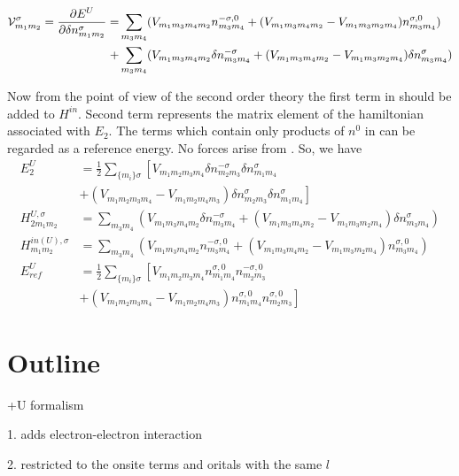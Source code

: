 \begin{equation}
\label{hamU}
\begin{split}
\mathcal{V}_{m_1m_2}^{\sigma}=\frac{\partial E^U}{\partial \delta n_{m_1m_2}^{\sigma}}=&\sum_{m_3m_4}(V_{m_1m_3m_4m_2}
n_{m_3m_4}^{-\sigma,0}+(V_{m_1m_3m_4m_2}-V_{m_1m_3m_2m_4})n_{m_3m_4}^{\sigma,0})\\
+&\sum_{m_3m_4}(V_{m_1m_3m_4m_2}
\delta n_{m_3m_4}^{-\sigma}+(V_{m_1m_3m_4m_2}-V_{m_1m_3m_2m_4})\delta n_{m_3m_4}^{\sigma})
\end{split}
\end{equation}
%
\par{Now from the point of view of the second order theory the first term in  should be added to $H^{in}$.
Second term represents the matrix element of the hamiltonian 
associated with $E_2$. The terms which contain only products of $n^0$ in  can be regarded as a reference energy. No forces arise from . So, we have}
%
\begin{equation}
\begin{split}
E_{2}^{U}&=\frac{1}{2}\sum_{\{m_i\}\sigma}\left [V_{m_1m_2m_3m_4}\delta n_{m_2m_3}^{-\sigma}\delta n_{m_1m_4}^{\sigma}\right. \\&\left.+
(V_{m_1m_2m_3m_4}-V_{m_1m_2m_4m_3})
\delta n_{m_2m_3}^{\sigma}\delta n_{m_1m_4}^{\sigma}\right]\\
H^{U,\sigma}_{2m_1m_2}&=\sum_{m_3m_4}(V_{m_1m_3m_4m_2}
\delta n_{m_3m_4}^{-\sigma}+(V_{m_1m_3m_4m_2}-V_{m_1m_3m_2m_4})\delta n_{m_3m_4}^{\sigma})\\
H^{in(U), \sigma}_{m_1m_2}&=\sum_{m_3m_4}(V_{m_1m_3m_4m_2}
n_{m_3m_4}^{-\sigma,0}+(V_{m_1m_3m_4m_2}-V_{m_1m_3m_2m_4})n_{m_3m_4}^{\sigma,0})\\
E^{U}_{ref}&=\frac{1}{2}\sum_{\{m_i\}\sigma}\left[V_{m_1m_2m_3m_4}n_{m_1m_4}^{\sigma, 0}n_{m_2m_3}^{-\sigma,0}\right. \\ &\left.+(V_{m_1m_2m_3m_4}-V_{m_1m_2m_4m_3})
n_{m_1m_4}^{\sigma, 0}n_{m_2m_3}^{\sigma,0}\right]
\end{split}
\end{equation}
%
\section{Outline}
+U formalism
\par{1. adds electron-electron interaction}
\par{2. restricted to the onsite terms and oritals with the same $l$}

